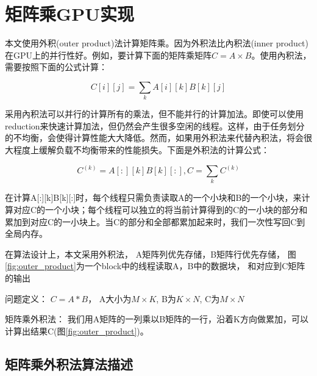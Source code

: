 \chapter{矩阵乘GPU实现}\label{chap:GEMMGPU}

本文使用外积(outer product)法计算矩阵乘。因为外积法比內积法(inner product)在GPU上的并行性好。例如，要计算下面的矩阵乘矩阵$C=A \times B$。使用內积法，需要按照下面的公式计算：

\begin{equation}
\label{eq:innerproduct}
C[i][j]=\sum_{k}A[i][k]B[k][j]
\end{equation}

采用內积法可以并行的计算所有的乘法，但不能并行的计算加法。即使可以使用reduction来快速计算加法，但仍然会产生很多空闲的线程。这样，由于任务划分的不均衡，会使得计算性能大大降低。然而，如果用外积法来代替內积法，将会很大程度上缓解负载不均衡带来的性能损失。下面是外积法的计算公式：

\begin{equation}
\label{eq:outerproduct}
C^{(k)}=A[:][k]B[k][:], C=\sum_{k}C^{(k)}
\end{equation}

在计算A[:][k]B[k][:]时，每个线程只需负责读取A的一个小块和B的一个小块，来计算对应C的一个小块；每个线程可以独立的将当前计算得到的C的一小块的部分和累加到对应C的一小块上。当C的部分和全部都累加起来时，我们一次性写回C到全局内存。

在算法设计上，本文采用外积法， A矩阵列优先存储，B矩阵行优先存储， 图\ref{fig:outer_product}为一个block中的线程读取A，B中的数据块， 和对应到C矩阵的输出

问题定义： $C = A * B$， A大小为$M \times K$, B为$K \times N$, C为$M \times N$

矩阵乘外积法： 我们用A矩阵的一列乘以B矩阵的一行，沿着K方向做累加，可以计算出结果C(图\ref{fig:outer_product})。

\section{矩阵乘外积法算法描述}

